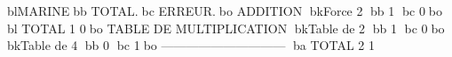 blMARINEbb           TOTAL.bc      ERREUR.bo
ADDITION
bkForce      2     bb  1	bc        0bo
bl TOTAL             1	        0bo
TABLE DE MULTIPLICATION
bkTable de   2     bb  1	bc        0bo
bkTable de   4     bb  0	bc        1bo
------------------------------
ba TOTAL             2	        1
